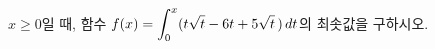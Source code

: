 \hspace*{2mm}\begin{minipage}[t]{\dimexpr\linewidth-2mm\relax}\vspace{0pt}
$x\ge 0$일 때, 함수 $f(x)=\displaystyle\int_{0}^{x}(t\sqrt{t}-6t+5\sqrt{t}\mkern3mu )\mkern3mu dt$의 최솟값을 구하시오.\end{minipage}
